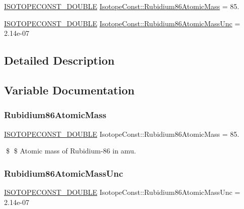 \begin{DoxyCompactItemize}
\item 
\mbox{\hyperlink{group___isotope_const-_macros_ga8f45a7272ce02c0b4c65c44636ed719a}{I\+S\+O\+T\+O\+P\+E\+C\+O\+N\+S\+T\+\_\+\+D\+O\+U\+B\+LE}} \mbox{\hyperlink{group___isotope_const-_rubidium-_rb86_ga999f17c281a14d8f7e1cf0b34a202e85}{Isotope\+Const\+::\+Rubidium86\+Atomic\+Mass}} = 85.
\item 
\mbox{\hyperlink{group___isotope_const-_macros_ga8f45a7272ce02c0b4c65c44636ed719a}{I\+S\+O\+T\+O\+P\+E\+C\+O\+N\+S\+T\+\_\+\+D\+O\+U\+B\+LE}} \mbox{\hyperlink{group___isotope_const-_rubidium-_rb86_ga5ea3c9a097a747e7fe95d892d541c8ff}{Isotope\+Const\+::\+Rubidium86\+Atomic\+Mass\+Unc}} = 2.\+14e-\/07
\end{DoxyCompactItemize}


\subsection{Detailed Description}


\subsection{Variable Documentation}
\mbox{\label{group___isotope_const-_rubidium-_rb86_ga999f17c281a14d8f7e1cf0b34a202e85}} 
\subsubsection{\texorpdfstring{Rubidium86\+Atomic\+Mass}{Rubidium86AtomicMass}}
{\footnotesize\ttfamily \mbox{\hyperlink{group___isotope_const-_macros_ga8f45a7272ce02c0b4c65c44636ed719a}{I\+S\+O\+T\+O\+P\+E\+C\+O\+N\+S\+T\+\_\+\+D\+O\+U\+B\+LE}} Isotope\+Const\+::\+Rubidium86\+Atomic\+Mass = 85.}

\$ \$ Atomic mass of Rubidium-\/86 in amu. \mbox{\label{group___isotope_const-_rubidium-_rb86_ga5ea3c9a097a747e7fe95d892d541c8ff}} 
\subsubsection{\texorpdfstring{Rubidium86\+Atomic\+Mass\+Unc}{Rubidium86AtomicMassUnc}}
{\footnotesize\ttfamily \mbox{\hyperlink{group___isotope_const-_macros_ga8f45a7272ce02c0b4c65c44636ed719a}{I\+S\+O\+T\+O\+P\+E\+C\+O\+N\+S\+T\+\_\+\+D\+O\+U\+B\+LE}} Isotope\+Const\+::\+Rubidium86\+Atomic\+Mass\+Unc = 2.\+14e-\/07}

